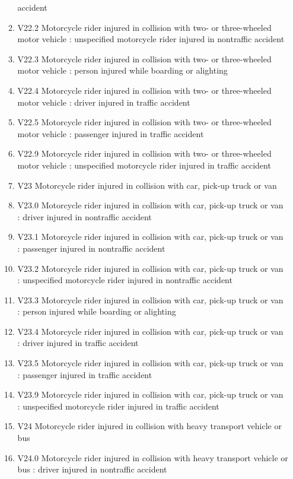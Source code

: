 \documentclass[
]{scrartcl}
\begin{document}
\begin{itemize}
\begin{enumerate}
    accident
  \item
    V22.2 Motorcycle rider injured in collision with two- or
    three-wheeled motor vehicle : unspecified motorcycle rider injured
    in nontraffic accident
  \item
    V22.3 Motorcycle rider injured in collision with two- or
    three-wheeled motor vehicle : person injured while boarding or
    alighting
  \item
    V22.4 Motorcycle rider injured in collision with two- or
    three-wheeled motor vehicle : driver injured in traffic accident
  \item
    V22.5 Motorcycle rider injured in collision with two- or
    three-wheeled motor vehicle : passenger injured in traffic accident
  \item
    V22.9 Motorcycle rider injured in collision with two- or
    three-wheeled motor vehicle : unspecified motorcycle rider injured
    in traffic accident
  \item
    V23 Motorcycle rider injured in collision with car, pick-up truck or
    van
  \item
    V23.0 Motorcycle rider injured in collision with car, pick-up truck
    or van : driver injured in nontraffic accident
  \item
    V23.1 Motorcycle rider injured in collision with car, pick-up truck
    or van : passenger injured in nontraffic accident
  \item
    V23.2 Motorcycle rider injured in collision with car, pick-up truck
    or van : unspecified motorcycle rider injured in nontraffic accident
  \item
    V23.3 Motorcycle rider injured in collision with car, pick-up truck
    or van : person injured while boarding or alighting
  \item
    V23.4 Motorcycle rider injured in collision with car, pick-up truck
    or van : driver injured in traffic accident
  \item
    V23.5 Motorcycle rider injured in collision with car, pick-up truck
    or van : passenger injured in traffic accident
  \item
    V23.9 Motorcycle rider injured in collision with car, pick-up truck
    or van : unspecified motorcycle rider injured in traffic accident
  \item
    V24 Motorcycle rider injured in collision with heavy transport
    vehicle or bus
  \item
    V24.0 Motorcycle rider injured in collision with heavy transport
    vehicle or bus : driver injured in nontraffic accident

\end{enumerate}
\end{itemize}
\end{document}
